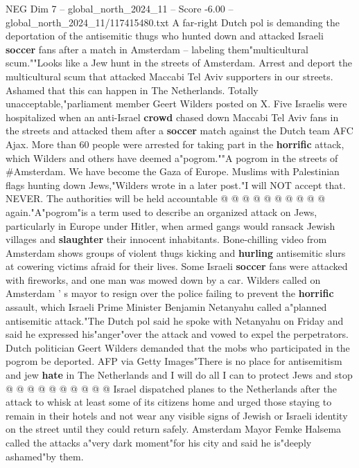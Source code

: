 \begin{textsample}{NEG Dim 7 – global\_north\_2024\_11 – Score -6.00 – global\_north\_2024\_11/117415480.txt}  \label{ex:f7_neg_258}
A far-right Dutch pol is demanding the deportation of the antisemitic thugs who hunted down and attacked Israeli \textbf{soccer} fans after a match in Amsterdam -- labeling them"multicultural scum.""Looks like a Jew hunt in the streets of Amsterdam.
Arrest and deport the multicultural scum that attacked Maccabi Tel Aviv supporters in our streets.
Ashamed that this can happen in The Netherlands.
Totally unacceptable,"parliament member Geert Wilders posted on X.
Five Israelis were hospitalized when an anti-Israel \textbf{crowd} chased down Maccabi Tel Aviv fans in the streets and attacked them after a \textbf{soccer} match against the Dutch team AFC Ajax.
More than 60 people were arrested for taking part in the \textbf{horrific} attack, which Wilders and others have deemed a"pogrom.""A pogrom in the streets of \#Amsterdam.
We have become the Gaza of Europe.
Muslims with Palestinian flags hunting down Jews,"Wilders wrote in a later post."I will NOT accept that.
NEVER.
The authorities will be held accountable @ @ @ @ @ @ @ @ @ @ again."A"pogrom"is a term used to describe an organized attack on Jews, particularly in Europe under Hitler, when armed gangs would ransack Jewish villages and \textbf{slaughter} their innocent inhabitants.
Bone-chilling video from Amsterdam shows groups of violent thugs kicking and \textbf{hurling} antisemitic slurs at cowering victims afraid for their lives.
Some Israeli \textbf{soccer} fans were attacked with fireworks, and one man was mowed down by a car.
Wilders called on Amsterdam ' s mayor to resign over the police failing to prevent the \textbf{horrific} assault, which Israeli Prime Minister Benjamin Netanyahu called a"planned antisemitic attack."The Dutch pol said he spoke with Netanyahu on Friday and said he expressed his"anger"over the attack and vowed to expel the perpetrators.
Dutch politician Geert Wilders demanded that the mobs who participated in the pogrom be deported.
AFP via Getty Images"There is no place for antisemitism and jew \textbf{hate} in The Netherlands and I will do all I can to protect Jews and stop @ @ @ @ @ @ @ @ @ @ Israel dispatched planes to the Netherlands after the attack to whisk at least some of its citizens home and urged those staying to remain in their hotels and not wear any visible signs of Jewish or Israeli identity on the street until they could return safely.
Amsterdam Mayor Femke Halsema called the attacks a"very dark moment"for his city and said he is"deeply ashamed"by them.

\end{textsample}

